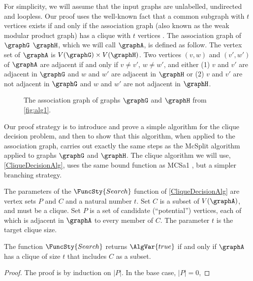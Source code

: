 For simplicity, we will assume that the input graphs are unlabelled,
undirected and loopless.
Our proof uses the well-known fact that a common subgraph with $t$ vertices exists
if and only if the association graph (also known as the weak modular product graph)
has a clique with $t$ vertices \cite{LeviG}.  The association graph of $\graphG$ 
$\graphH$, which we will
call $\graphA$, is defined as follow.  The vertex set of $\graphA$ is
$V(\graphG) \times V(\graphH)$.  Two vertices $(v,w)$ and $(v',w')$ of $\graphA$
are adjacent if and only if $v \not= v'$, $w \not= w'$, and either (1) $v$ and $v'$
are adjacent in $\graphG$ and $w$ and $w'$ are adjacent in $\graphH$ or (2) $v$ and $v'$
are not adjacent in $\graphG$ and $w$ and $w'$ are not adjacent in $\graphH$.

\begin{figure}[htb]
\centering
\caption{The association graph of graphs $\graphG$ and $\graphH$ from \cref{fig:alg1}.}
\label{fig:association-graph}
\end{figure}

Our proof strategy is to introduce and prove a simple algorithm for the clique
decision problem, and then to show that this algorithm, when applied to the association
graph, carries out exactly the same steps as the McSplit algorithm applied to graphs
$\graphG$ and $\graphH$.  The clique algorithm we will use, \cref{CliqueDecisionAlg},
uses the same bound function as MCSa1 \cite{DBLP:journals/algorithms/Prosser12,DBLP:journals/ieicet/TomitaSHW13},
but a simpler branching strategy.

The parameters of the $\FuncSty{Search}$ function of \cref{CliqueDecisionAlg}
are vertex sets $P$ and $C$ and a natural number $t$.  Set $C$ is a subset of $V(\graphA)$,
and must be a clique. Set $P$ is a set of candidate (``potential'') vertices, each of which
is adjacent in $\graphA$ to every member of $C$.  The parameter $t$ is the target clique size.

\begin{proposition}\label{cliqueAlgProp}
  The function $\FuncSty{Search}$ returns $\AlgVar{true}$ if and only if $\graphA$ has a clique
  of size $t$ that includes $C$ as a subset.
\end{proposition}
\begin{proof}
  The proof is by induction on $|P|$.  In the base case, $|P|=0$, 
\end{proof}

